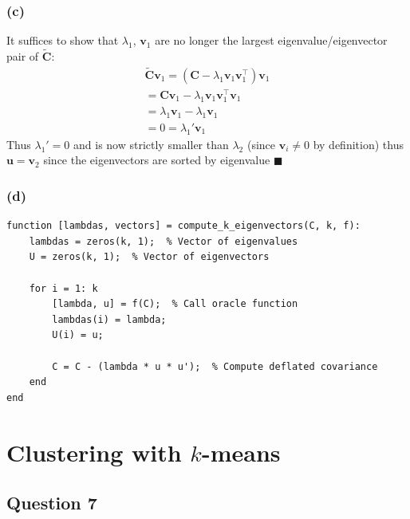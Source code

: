 \documentclass[11pt, oneside]{article}   	%
\begin{document}
\subsubsection{(c)}
It suffices to show that $\lambda_1$, $\boldsymbol{v}_1$ are no longer the largest eigenvalue/eigenvector pair of $\boldsymbol{\tilde{C}}$:
\begin{gather*}
\boldsymbol{\tilde{C}}\boldsymbol{v}_1 = (\boldsymbol{C} - \lambda_1\boldsymbol{v}_{1} \boldsymbol{v}_{1}^{\top})\boldsymbol{v}_1 \\
= \boldsymbol{C}\boldsymbol{v}_1 - \lambda_1\boldsymbol{v}_{1} \boldsymbol{v}_{1}^{\top}\boldsymbol{v}_1\\
= \lambda_1\boldsymbol{v}_1 - \lambda_1\boldsymbol{v}_1\\
= 0 = \lambda_1'\boldsymbol{v}_1
\end{gather*}
Thus $\lambda_1' = 0$ and is now strictly smaller than $\lambda_2$ (since $\boldsymbol{v}_i \neq 0$ by definition) thus $\boldsymbol{u} = \boldsymbol{v}_2$ since the eigenvectors are sorted by eigenvalue $\blacksquare$

\subsubsection{(d)}
\begin{verbatim}
function [lambdas, vectors] = compute_k_eigenvectors(C, k, f):
    lambdas = zeros(k, 1);  % Vector of eigenvalues
    U = zeros(k, 1);  % Vector of eigenvectors
    
    for i = 1: k
        [lambda, u] = f(C);  % Call oracle function
        lambdas(i) = lambda;
        U(i) = u;
        
        C = C - (lambda * u * u');  % Compute deflated covariance
    end
end
\end{verbatim}
\newpage{}
\section{ Clustering with $k$-means}
\subsection{Question 7}
\end{document}
